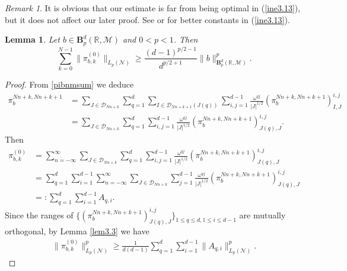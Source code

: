 \documentclass[oneside,english,a4wide]{amsart}
\numberwithin{equation}{section}
\numberwithin{figure}{section}
\theoremstyle{plain}
\theoremstyle{plain}
\theoremstyle{definition}
\theoremstyle{plain}
\newtheorem{lemma}[thm]{Lemma}
\theoremstyle{remark}
\theoremstyle{definition}
\theoremstyle{remark}
\newtheorem{remark}[thm]{Remark}
\theoremstyle{definition}
\newcommand{\M}{{\mathcal M}}
\newcommand{\8}{\infty}
\begin{document}
\begin{remark}
	It is obvious that our estimate is far from being optimal in (\ref{ine3.13}), but it does not affect our later proof. See \cite[Theorem 1.3]{JXu} or \cite[Lemma 2.1]{CRX} for better constants in (\ref{ine3.13}).
\end{remark}
\begin{lemma}\label{lem3.4}
	Let $b\in\pmb{B}^d_p(\mathbb{R},\M)$ and $0<p<1$. Then
	\[\sum_{k=0}^{N-1}\|\pi_{b,k}^{(0)}\|_{{L_p(\mathcal{N})}}\ge \frac{(d-1)^{p/2-1}}{d^{p/2+1}}\|b\|^p_{\pmb{B}^d_p(\mathbb{R},\M)}.\]
\end{lemma}
\begin{proof}
	From \eqref{pibnmsum} we deduce
	\begin{equation*}
		\begin{aligned}
			\pi_b^{Nn+k,Nn+k+1}{}&=\sum_{J\in \mathcal{D}_{Nn+k}}\sum_{q=1}^{d}\sum_{I\in \mathcal{D}_{Nn+k+1}(J(q))}\sum_{i,j=1}^{d-1}\frac{\omega^{qj}}{|J|^{1/2}}(\pi_b^{Nn+k,Nn+k+1})_{I,J}^{i,j}\\&=\sum_{J\in \mathcal{D}_{Nn+k}}\sum_{q=1}^d\sum_{i,j=1}^{d-1}\frac{\omega^{qj}}{|J|^{1/2}}(\pi_b^{Nn+k,Nn+k+1})_{J(q),J}^{i,j}.
		\end{aligned}
	\end{equation*}
	Then 
	\begin{equation*}
		\begin{aligned}
			\pi^{(0)}_{b,k}{}&=\sum_{n=-\infty}^{\infty}\sum_{J\in \mathcal{D}_{Nn+k}}\sum_{q=1}^d\sum_{i,j=1}^{d-1}\frac{\omega^{qj}}{|J|^{1/2}}(\pi_b^{Nn+k,Nn+k+1})_{J(q),J}^{i,j}\\
			&=\sum_{q=1}^d\sum_{i=1}^{d-1} \sum_{n=-\infty}^{\infty}\sum_{J\in \mathcal{D}_{Nn+k}}\sum_{j=1}^{d-1}\frac{\omega^{qj}}{|J|^{1/2}}(\pi_b^{Nn+k,Nn+k+1})_{J(q),J}^{i,j}\\
			&=:\sum_{q=1}^d\sum_{i=1}^{d-1}A_{q,i}.
		\end{aligned}
	\end{equation*}
	Since the ranges of $\{(\pi_b^{Nn+k,Nn+k+1})_{J(q),J}^{i,j}\}_{1\leq q\leq d, 1\leq i\leq d-1}$ are mutually orthogonal, by Lemma \ref{lem3.3} we have 
	\begin{equation*}\label{3.4.1}
		\begin{aligned}
			\|\pi^{(0)}_{b,k}\|^p_{{L_p(\mathcal{N})}}\ge \frac{1}{d(d-1)}\sum_{q=1}^d\sum_{i=1}^{d-1}\| A_{q,i}\|^p_{L_p(\mathcal{N})}.
		\end{aligned}
	\end{equation*}

\end{proof}
\end{document}
